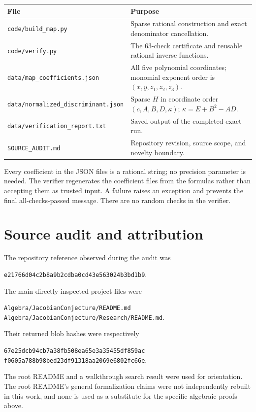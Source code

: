 \documentclass[11pt,a4paper]{article}
\theoremstyle{definition}
\newcommand{\kk}{\kappa}
\newcommand{\code}[1]{\texttt{\nolinkurl{#1}}}
\begin{document}
\begin{center}\small
\renewcommand{\arraystretch}{1.25}
\begin{tabularx}{\textwidth}{@{}>{\raggedright\arraybackslash}p{}X@{}}
\toprule
File & Purpose\\
\midrule
\code{code/build_map.py} & Sparse rational construction and exact denominator cancellation.\\
\code{code/verify.py} & The 63-check certificate and reusable rational inverse functions.\\
\code{data/map_coefficients.json} & All five polynomial coordinates; monomial exponent order is $(x,y,z_1,z_2,z_3)$.\\
\code{data/normalized_discriminant.json} & Sparse $H$ in coordinate order $(c,A,B,D,\kk)$; $\kk=E+B^2-AD$.\\
\code{data/verification_report.txt} & Saved output of the completed exact run.\\
\code{SOURCE_AUDIT.md} & Repository revision, source scope, and novelty boundary.\\
\bottomrule
\end{tabularx}
\end{center}

Every coefficient in the JSON files is a rational string; no precision
parameter is needed. The verifier regenerates the coefficient files
from the formulas rather than accepting them as trusted input.
A failure raises an exception and prevents the final all-checks-passed
message. There are no random checks in the verifier.

\section{Source audit and attribution}
\label{app:sources}
The repository reference observed during the audit was
\begin{center}\small
\code{e21766d04c2b8a9b2cdba0cd43e563024b3bd1b9}.
\end{center}
The main directly inspected project files were
\begin{center}\small
\code{Algebra/JacobianConjecture/README.md}\\
\code{Algebra/JacobianConjecture/Research/README.md}.
\end{center}
Their returned blob hashes were respectively
\begin{center}\small
\code{67e25dcb94cb7a38fb508ea65e3a35455df859ac}\\
\code{f0605a788b98bed23df91318aa2069e6802fc66e}.
\end{center}
The root README and a walkthrough search result were used for orientation.
The root README's general formalization claims were not independently
rebuilt in this work, and none is used as a substitute for the specific
algebraic proofs above.
\end{document}
